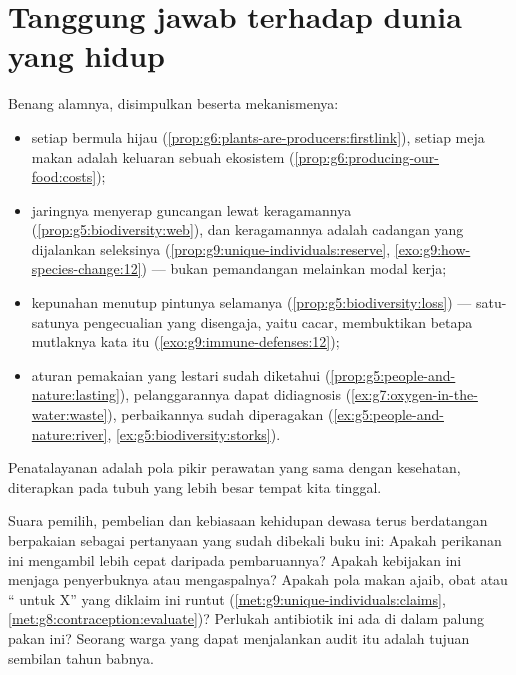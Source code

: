 \section{Tanggung jawab terhadap dunia yang hidup}

\begin{proposition}\label{prop:g9:our-responsibility:stewardship}
Benang alamnya, disimpulkan beserta mekanismenya:
\begin{itemize}
  \item setiap  bermula hijau
        (\cref{prop:g6:plants-are-producers:firstlink}),
        setiap meja makan adalah keluaran sebuah ekosistem
        (\cref{prop:g6:producing-our-food:costs});
  \item jaringnya menyerap guncangan lewat keragamannya
        (\cref{prop:g5:biodiversity:web}), dan keragamannya
        adalah cadangan yang dijalankan seleksinya
        (\cref{prop:g9:unique-individuals:reserve},
        \cref{exo:g9:how-species-change:12}) ---
         bukan pemandangan melainkan
        modal kerja;
  \item kepunahan menutup pintunya selamanya
        (\cref{prop:g5:biodiversity:loss}) --- satu-satunya
        pengecualian yang disengaja, yaitu cacar,
        membuktikan betapa mutlaknya kata itu
        (\cref{exo:g9:immune-defenses:12});
  \item aturan pemakaian yang lestari sudah diketahui
        (\cref{prop:g5:people-and-nature:lasting}),
        pelanggarannya dapat didiagnosis
        (\cref{ex:g7:oxygen-in-the-water:waste}),
        perbaikannya sudah diperagakan
        (\cref{ex:g5:people-and-nature:river},
        \cref{ex:g5:biodiversity:storks}).
\end{itemize}
Penatalayanan adalah pola pikir perawatan yang sama dengan
kesehatan, diterapkan pada tubuh yang lebih besar tempat
kita tinggal.
\end{proposition}
\admitted

\begin{example}\label{ex:g9:our-responsibility:citizen}
Suara pemilih, pembelian dan kebiasaan kehidupan dewasa
terus berdatangan berpakaian sebagai pertanyaan yang sudah
dibekali buku ini: Apakah perikanan ini mengambil lebih
cepat daripada pembaruannya? Apakah kebijakan ini menjaga
 penyerbuknya atau mengaspalnya? Apakah pola makan
ajaib, obat atau `` untuk X'' yang diklaim ini runtut
(\cref{met:g9:unique-individuals:claims},
\cref{met:g8:contraception:evaluate})? Perlukah antibiotik
ini ada di dalam palung pakan ini? Seorang warga yang dapat
menjalankan audit itu adalah tujuan sembilan tahun babnya.
\end{example}


